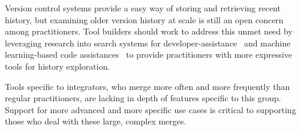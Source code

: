 Version control systems provide a easy way of storing and retrieving recent history, but examining older version history at scale is still an open concern among practitioners.
Tool builders should work to address this unmet need by leveraging research into search systems for developer-assistance~\cite{nabi2016putting} and machine learning-based code assistances~\cite{bradley2011history_exploration} to provide practitioners with more expressive tools for history exploration.

Tools specific to integrators, who merge more often and more frequently than regular practitioners, are lacking in depth of features specific to this group.
Support for more advanced and more specific use cases is critical to supporting those who deal with these large, complex merges.
